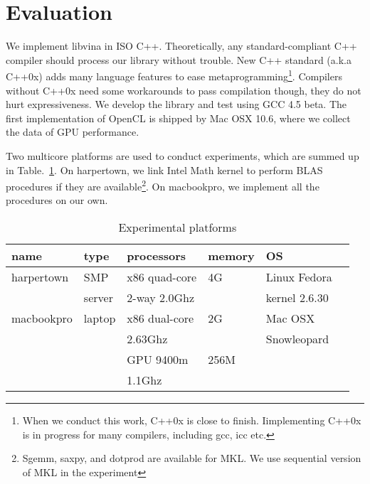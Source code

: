 \section{Evaluation}\label{sec:eval}
We implement libvina in ISO
C++. Theoretically, any standard-compliant C++ compiler
should process our library without trouble. New C++ standard (a.k.a C++0x\cite{c++0x}) adds many language features to ease metaprogramming\footnote{When we conduct this work, C++0x is close to finish. Iimplementing C++0x
  is in progress for many compilers, including gcc, icc etc.}. Compilers
without C++0x need some workarounds to pass compilation
though, they do not hurt expressiveness. We develop the library and
test using GCC 4.5 beta.  The
first implementation of OpenCL is shipped by Mac OSX 10.6, where we
collect the data of GPU performance.

Two multicore platforms are used to conduct experiments, which are summed up in Table.~\ref{tbl:mach}. On harpertown, we link Intel Math kernel to perform BLAS procedures
if they are available\footnote{Sgemm, saxpy, and dotprod are available
  for MKL. We use sequential version of MKL in the experiment}. On macbookpro, we implement all the procedures on
our own. 

\begin{table}[hbt]
\caption{Experimental platforms}\label{tbl:mach}
\begin{center}
\begin{tabular}{|l|l|l|l|l|r|}
\hline
\textbf{name}&\textbf{type}&\textbf{processors}&\textbf{memory}&\textbf{OS}\\
\hline
harpertown&SMP &x86 quad-core  &4G&Linux Fedora\\
                  &  server &   
2-way  2.0Ghz & &kernel 2.6.30\\
\hline
macbookpro&laptop &x86 dual-core &2G&Mac OSX\\
                    &           & 2.63Ghz         &  &Snowleopard\\
                   &           &GPU 9400m    &256M & \\
                    &           & 1.1Ghz   & &\\
\hline
\end{tabular} 
\end{center}
\end{table}

